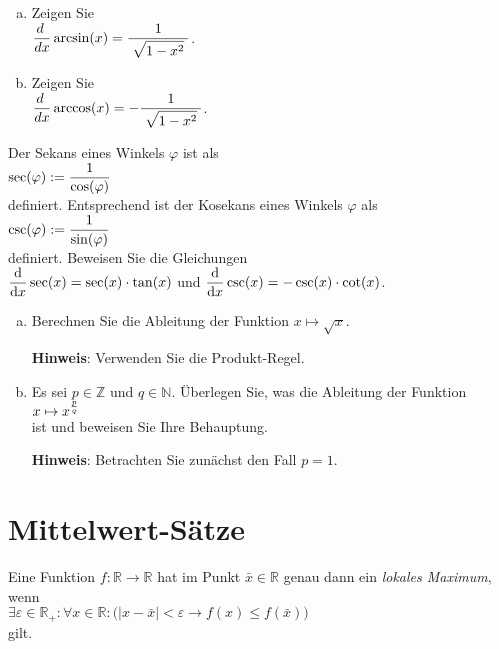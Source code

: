 \exercise
\begin{enumerate}[(a)]
\item Zeigen Sie 
      \\[0.3cm]
      \hspace*{1.3cm} 
      $\displaystyle\frac{d\;}{dx} \arcsin(x) = \displaystyle\frac{\;\displaystyle1\;}{\;\displaystyle\sqrt{1 - x^2}\;}$.  
\item Zeigen Sie 
      \\[0.3cm]
      \hspace*{1.3cm} 
      $\displaystyle\frac{d\;}{dx} \arccos(x) = -\displaystyle\frac{\;\displaystyle1\;}{\;\displaystyle\sqrt{1 - x^2}\;}$.   \eox
\end{enumerate}


\exercise
Der Sekans eines Winkels $\varphi$ ist als
\\[0.2cm]
\hspace*{1.3cm}
$\displaystyle \sec(\varphi) := \frac{1}{\cos(\varphi)}$
\\[0.2cm]
definiert.  Entsprechend ist der Kosekans eines Winkels $\varphi$ als
\\[0.2cm]
\hspace*{1.3cm}
$\displaystyle \csc(\varphi) := \frac{1}{\sin(\varphi)}$
\\[0.2cm]
definiert.  Beweisen Sie die Gleichungen
\\[0.2cm]
\hspace*{1.3cm}
$\displaystyle \displaystyle\frac{\textrm{d}}{\textrm{d}x} \sec(x) = \sec(x) \cdot \tan(x)$ \quad und \quad
$\displaystyle \displaystyle\frac{\textrm{d}}{\textrm{d}x} \csc(x) = -\csc(x) \cdot \cot(x)$. \eox
\pagebreak

\exercise
\begin{enumerate}[(a)]
\item Berechnen Sie die Ableitung der Funktion $x \mapsto \sqrt{x}$.  

      \textbf{Hinweis}: Verwenden Sie die Produkt-Regel. 
\item Es sei $p \in \mathbb{Z}$ und $q \in \mathbb{N}$.  \"Uberlegen Sie, was die Ableitung der Funktion
      \\[0.2cm]
      \hspace*{1.3cm}
      $\displaystyle x \mapsto x^{\normalsize\frac{p}{q}}$
      \\[0.2cm]
      ist und beweisen Sie Ihre Behauptung.

      \textbf{Hinweis}: Betrachten Sie zun\"achst den Fall $p = 1$.  \eox
\end{enumerate}

\section{Mittelwert-S\"atze}
\begin{Definition} \lb
  Eine Funktion $f:\mathbb{R} \rightarrow \mathbb{R}$ hat im Punkt $\bar{x}\in \mathbb{R}$ genau dann ein \emph{lokales Maximum}, wenn 
  \\[0.2cm]
  \hspace*{1.3cm}
  $\exists \varepsilon \in \mathbb{R}_+:\forall x \in \mathbb{R}: 
    \bigl(|x - \bar{x}| < \varepsilon \rightarrow f(x) \leq f(\bar{x})\bigr)
   $
  \\[0.2cm]
  gilt.
  \eod
\end{Definition}

